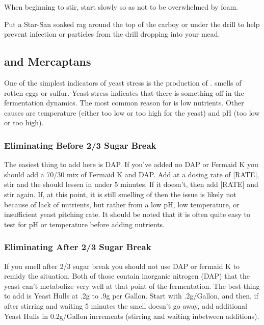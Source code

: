\documentclass{article}
\begin{document}
   When beginning to stir, start slowly so as not to be overwhelmed by foam. 

   Put a Star-San soaked rag around the top of the carboy or under the drill to help prevent infection or particles 
   from the drill dropping into your mead.

 \subsection{ and Mercaptans}
  One of the simplest indicators of yeast stress is the production of .  smells of rotten eggs or 
  sulfur. Yeast stress indicates that there is something off in the fermentation dynamics. The most common reason 
  for  is low nutrients. Other causes are temperature (either too low or too high for the yeast) and pH 
  (too low or too high).

  \subsubsection{Eliminating Before 2/3 Sugar Break}
   The easiest thing to add here is DAP. If you've added no DAP or Fermaid K you should add a 70/30 mix of Fermaid K
   and DAP. Add at a dosing rate of [RATE], stir and the 
    should lessen in under 5 minutes. If it doesn't, then add [RATE] and stir again. If, at this point, 
   it is still smelling of  then the issue is likely not because of lack of nutrients, but rather from a 
   low pH, low temperature, or insufficient yeast pitching rate. It should be noted that it is often quite easy 
   to test for pH or temperature before adding nutrients.

  \subsubsection{Eliminating After 2/3 Sugar Break} 
   If you smell  after 2/3 sugar break you should not use DAP or fermaid K to remidy the situation. Both of
   those contain inorganic nitrogen (DAP) that the yeast can't metabolize very well at that point of the 
   fermentation. The best thing to add is Yeast Hulls at .2g to .9g per Gallon. Start with .2g/Gallon, and
   then, if after stirring and waiting 5 minutes the  smell doesn't go away, add additional Yeast Hulls 
   in 0.2g/Gallon increments (stirring and waiting inbetween additions).
\end{document}
